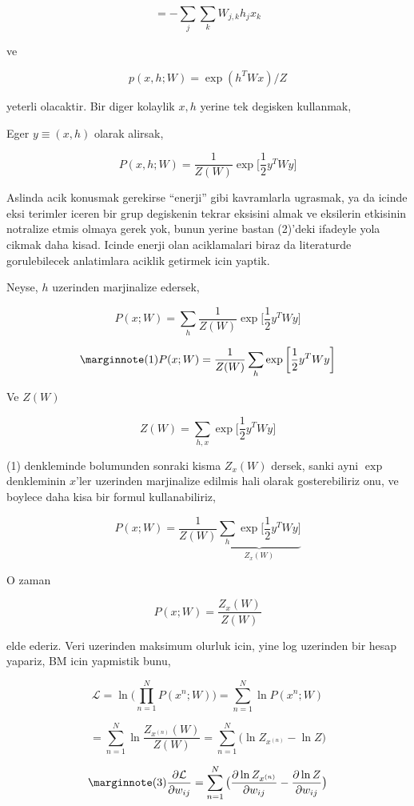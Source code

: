 \documentclass[12pt,fleqn]{article}\usepackage{../common}
\begin{document}
$$ = - \sum_j \sum_k W_{j,k}h_jx_k  $$

ve

$$ p(x,h;W)  = \exp (h^TWx) / Z $$

yeterli olacaktir. Bir diger kolaylik $x,h$ yerine tek degisken kullanmak,

Eger $y \equiv (x,h)$ olarak alirsak, 


$$ P(x,h;W) = \frac{1}{Z(W)} \exp 
\bigg[ 
\frac{1}{2} y^T W y
\bigg]
$$

Aslinda acik konusmak gerekirse ``enerji'' gibi kavramlarla ugrasmak, ya da
icinde eksi terimler iceren bir grup degiskenin tekrar eksisini almak ve
eksilerin etkisinin notralize etmis olmaya gerek yok, bunun yerine bastan
(2)'deki ifadeyle yola cikmak daha kisad. Icinde enerji olan aciklamalari
biraz da literaturde gorulebilecek anlatimlara aciklik getirmek icin
yaptik.

Neyse, $h$ uzerinden marjinalize edersek,

$$ P(x;W) = \sum_h \frac{1}{Z(W)} \exp 
\bigg[ 
\frac{1}{2} y^T W y
\bigg]
$$


$$  
\mlabel{1}
P(x;W) = \frac{1}{Z(W)}  \sum_h \exp 
\bigg[ 
\frac{1}{2} y^T W y
\bigg]
$$


Ve $Z(W)$ 

$$ Z(W) = \sum_{h,x} \exp 
\bigg[ 
\frac{1}{2} y^T W y
\bigg]
$$

(1) denkleminde bolumunden sonraki kisma $Z_x(W)$ dersek, sanki ayni $\exp$
denkleminin $x$'ler uzerinden marjinalize edilmis hali olarak
gosterebiliriz onu, ve boylece daha kisa bir formul kullanabiliriz,

$$  
P(x;W) = \frac{1}{Z(W)}  
\underbrace{
\sum_h \exp 
\bigg[ 
\frac{1}{2} y^T W y
\bigg]
}_{Z_x(W)}
$$

O zaman 

$$  
P(x;W) = \frac{Z_x(W)}{Z(W)} 
$$

elde ederiz. Veri uzerinden maksimum olurluk icin, yine log uzerinden bir
hesap yapariz, BM icin yapmistik bunu,

$$  
\mathcal{L} = 
\ln \big( \prod_{n=1}^{N} P(x^{n};W) \big) = 
\sum_{n=1}^{N} \ln P(x^{n};W) 
$$

$$ 
= \sum_{n=1}^{N} \ln \frac{Z_{x^{(n)}}(W)}{Z(W)}  
= \sum_{n=1}^{N}  \big(\ln Z_{x^{(n)}} - \ln Z \big) 
$$

$$ 
\mlabel{3}
\frac{\partial \mathcal{L} }{\partial w_{ij}} = 
\sum_{n=1}^{N}  \big( \frac{\partial \ln Z_{x^{(n)}} }{\partial w_{ij}}
- \frac{\partial \ln Z }{\partial w_{ij}} \big)
$$
\end{document}
